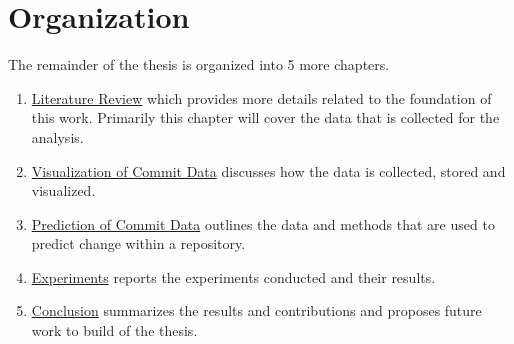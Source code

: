 \section{Organization}

The remainder of the thesis is organized into 5 more chapters.

\begin{enumerate}
\item \hyperref[chap:related_works]{Literature Review} which provides more details related to the foundation of this work. Primarily this chapter will cover the data that is collected for the analysis.
\item \hyperref[chap:visualization]{Visualization of Commit Data} discusses how the data is collected, stored and visualized.
\item \hyperref[chap:prediction]{Prediction of Commit Data} outlines the data and methods that are used to predict change within a repository.
\item \hyperref[chap:experiments]{Experiments} reports the experiments conducted and their results.
\item \hyperref[chap:conclusions]{Conclusion} summarizes the results and contributions and proposes future work to build of the thesis.
\end{enumerate}

